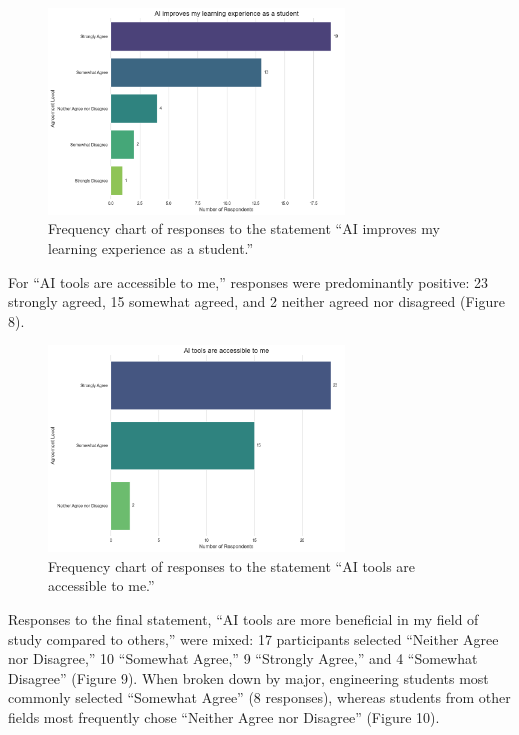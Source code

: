 \documentclass[12pt]{article}
\begin{document}
\begin{figure}[htbp]
  \centering
  \includegraphics[width=0.7\textwidth]{fig7.png} %
  \caption{\centering Frequency chart of responses to the statement “AI improves my learning experience as a student.”}
  \label{fig:example1}
\end{figure}

For “AI tools are accessible to me,” responses were predominantly positive: 23 strongly agreed, 15 somewhat agreed, and 2 neither agreed nor disagreed (Figure 8).

\begin{figure}[htbp]
  \centering
  \includegraphics[width=0.7\textwidth]{fig8.png} %
  \caption{\centering Frequency chart of responses to the statement “AI tools are accessible to me.”}
  \label{fig:example1}
\end{figure}

Responses to the final statement, “AI tools are more beneficial in my field of study compared to others,” were mixed: 17 participants selected “Neither Agree nor Disagree,” 10 “Somewhat Agree,” 9 “Strongly Agree,” and 4 “Somewhat Disagree” (Figure 9). When broken down by major, engineering students most commonly selected “Somewhat Agree” (8 responses), whereas students from other fields most frequently chose “Neither Agree nor Disagree” (Figure 10).
\end{document}
